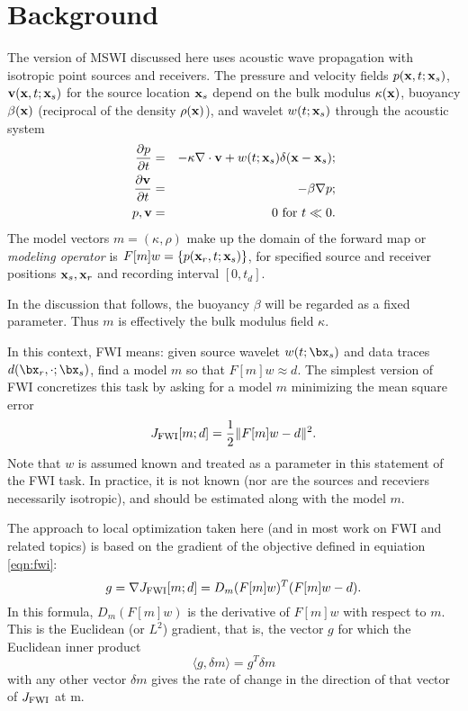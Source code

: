 \section{Background}
The version of MSWI discussed here uses acoustic wave propagation with
isotropic point sources and receivers.
The pressure and velocity fields $p({\bf x},t;{\bf x}_s)$, ${\bf v}({\bf x},t;{\bf x}_s)$ for the source location ${\bf x}_s$ depend on the bulk modulus $\kappa({\bf x})$, buoyancy $\beta({\bf x})$ (reciprocal of the density $\rho({\bf x})$), and wavelet $w(t;{\bf x}_s)$ through the acoustic system
\begin{eqnarray}
  \label{eqn:awe}
 \frac{\partial p}{\partial t} & = &- \kappa \nabla \cdot {\bf v} +
w(t;{\bf x}_s) \delta({\bf x}-{\bf x}_s); \nonumber \\
\frac{\partial {\bf v}}{\partial t} & = & - \beta \nabla p; \\ 
p, {\bf v} & = & 0 \mbox{ for }  t \ll 0.
\end{eqnarray}
The model vectors $m=(\kappa,\rho)$ make up the domain of the forward
map or {\em modeling operator} is $F[m]w = \{p({\bf x}_r,t;{\bf
  x}_s)\}$, for specified source and receiver positions ${\bf x}_s, {\bf x}_r$ and
recording interval $[0,t_d]$.

In the discussion that follows, the buoyancy $\beta$ will be regarded
as a fixed parameter. Thus $m$ is effectively the bulk modulus field $\kappa$.

In this context, FWI means: given source wavelet
$w(t;\bx_s)$ and data traces $d(\bx_r,\cdot;\bx_s)$, find a model $m$
so that $F[m]w \approx d$. The
simplest version of FWI concretizes this task by asking for a model
$m$ minimizing the mean square error
\begin{equation}
  \label{eqn:fwi}
  J_{\rm FWI}[m;d]= \frac{1}{2}\|F[m]w-d\|^2.
\end{equation}
Note that $w$ is assumed known and treated as a parameter in this
statement of the FWI task. In practice, it is not known (nor are the
sources and receviers necessarily isotropic), and should be estimated
along with the model $m$.

The approach to local optimization taken here (and in most work on FWI
and related topics) is based on the gradient of the objective defined
in equiation \ref{eqn:fwi}:
\begin{equation}
  \label{eqn:fwigrad}
  g = \nabla  J_{\rm FWI}[m;d] = D_m(F[m]w)^T(F[m]w-d).
\end{equation}
In this formula, $D_m(F[m]w)$ is the derivative of $F[m]w$ with
respect to $m$. 
This is the Euclidean (or $L^2$) gradient, that is, the vector $g$ for
which the Euclidean inner product
\begin{equation}
  \label{eqn:eucip}
  \langle g, \delta m\rangle = g^T\delta m
\end{equation}
with any other vector $\delta m$ gives the
rate of change in the direction of that vector of $J_{\rm FWI}$ at m.

